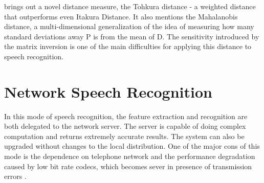 \cite{1165058} brings out a novel distance measure, the Tohkura distance - a weighted distance that outperforms even Itakura Distance. It also mentions the Mahalanobis distance, a multi-dimensional generalization of the idea of measuring how many standard deviations away P is from the mean of D. The sensitivity introduced by the matrix inversion is one of the main difficulties for applying this distance to speech recognition.

\section{Network Speech Recognition}

In this mode of speech recognition, the feature extraction and recognition are both delegated to the network server. The server is capable of doing complex computation and returns extremely accurate results. The system can also be upgraded without changes to the local distribution. One of the major cons of this mode is the dependence on telephone network and the performance degradation caused by low bit rate codecs, which becomes sever in presence of transmission errors \cite{Kumar_rethinkingspeech}.